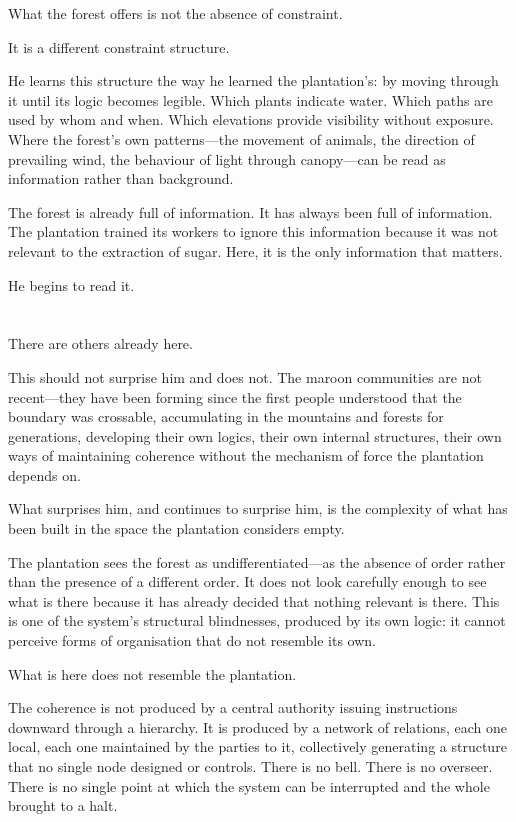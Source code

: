 What the forest offers is not the absence of constraint.

It is a different constraint structure.

He learns this structure the way he learned the plantation's:
by moving through it until its logic becomes legible. Which
plants indicate water. Which paths are used by whom and when.
Which elevations provide visibility without exposure. Where the
forest's own patterns---the movement of animals, the direction
of prevailing wind, the behaviour of light through canopy---can
be read as information rather than background.

The forest is already full of information. It has always been
full of information. The plantation trained its workers to ignore
this information because it was not relevant to the extraction
of sugar. Here, it is the only information that matters.

He begins to read it.

\section{}

There are others already here.

This should not surprise him and does not. The maroon communities
are not recent---they have been forming since the first people
understood that the boundary was crossable, accumulating in the
mountains and forests for generations, developing their own
logics, their own internal structures, their own ways of
maintaining coherence without the mechanism of force the
plantation depends on.

What surprises him, and continues to surprise him, is the
complexity of what has been built in the space the plantation
considers empty.

The plantation sees the forest as undifferentiated---as the
absence of order rather than the presence of a different order.
It does not look carefully enough to see what is there because
it has already decided that nothing relevant is there. This is
one of the system's structural blindnesses, produced by its own
logic: it cannot perceive forms of organisation that do not
resemble its own.

What is here does not resemble the plantation.

The coherence is not produced by a central authority issuing
instructions downward through a hierarchy. It is produced by
a network of relations, each one local, each one maintained
by the parties to it, collectively generating a structure that
no single node designed or controls. There is no bell. There
is no overseer. There is no single point at which the system
can be interrupted and the whole brought to a halt.


